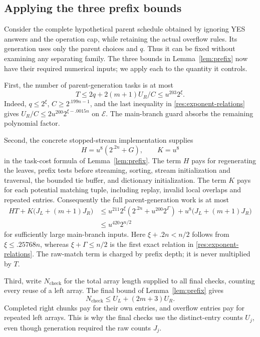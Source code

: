 \subsection{Applying the three prefix bounds}

Consider the complete hypothetical parent schedule obtained by ignoring
YES answers and the operation cap, while retaining the actual overflow
rules. Its generation uses only the parent choices and \(q\). Thus it
can be fixed without examining any separating family. The three
bounds in Lemma~\ref{lem:prefix} now have their required numerical
inputs; we apply each to the quantity it controls.

First, the number of parent-generation tasks is at most
\begin{equation}\label{res:task-count}
 T\le 2q+2(m+1)U_R/C\le u^{203}2^\xi.
\end{equation}
Indeed, \(q\le2^\xi\), \(C\ge2^{.199n-1}\), and the last inequality in
\eqref{res:exponent-relations} gives
\(U_R/C\le2u^{200}2^{\xi-.0015n}\) on \(\mathcal E\).
The main-branch guard absorbs the remaining polynomial factor.

Second, the concrete stopped-stream implementation supplies
\begin{equation}\label{res:nonmatch-cost}
 H=u^8(2^{.2n}+G),\qquad K=u^8
\end{equation}
in the task-cost formula of Lemma~\ref{lem:prefix}. The term \(H\)
pays for regenerating the leaves, prefix tests before streaming,
sorting, stream initialization and traversal, the bounded tie buffer,
and dictionary initialization. The term \(K\) pays for each potential
matching tuple, including replay, invalid local overlaps and repeated
entries. Consequently the full parent-generation work is at most
\[
 \begin{aligned}
 H T+K\bigl(J_L+(m+1)J_R\bigr)
 &\le u^{211}2^\xi(2^{.2n}+u^{200}2^\Gamma)
       +u^8\bigl(J_L+(m+1)J_R\bigr)\\
 &\le u^{420}2^{n/2}
 \end{aligned}
\]
for sufficiently large main-branch inputs. Here \(\xi+.2n<n/2\) follows
from \(\xi\le.25768n\), whereas \(\xi+\Gamma\le n/2\) is the first
exact relation in \eqref{res:exponent-relations}. The raw-match term
is charged by prefix depth; it is never multiplied by \(T\).

Third, write \(N_{\mathrm{check}}\) for the total array length supplied
to all final checks, counting every reuse of a left array. The final
bound of Lemma~\ref{lem:prefix} gives
\begin{equation}\label{res:check-inputs}
 N_{\mathrm{check}}\le U_L+(2m+3)U_R.
\end{equation}
Completed right chunks pay for their own entries, and overflow entries
pay for repeated left arrays. This is why the final checks use the
distinct-entry counts \(U_j\), even though generation required the raw
counts \(J_j\).

